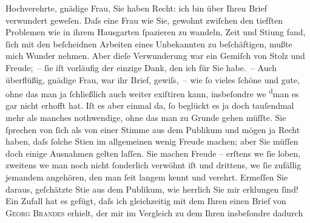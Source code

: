 \pstart{}Hochverehrte, gnädige Frau,\pend\vspace{0.5em}
\pstart
           Sie haben Recht: ich bin über Ihren Brief verwundert geweſen. Daſs eine Frau wie Sie,
               gewohnt zwiſchen den tiefſten Problemen wie in ihrem Hausgarten{ }ſpazieren zu wandeln,
               Zeit und Sti{\geminationm}ung fand,{ }ſich mit den beſcheidnen Arbeiten
               eines Unbekannten zu beſchäftigen, mußte mich Wunder nehmen. Aber dieſe Verwunderung
                  {\pb}war ein Gemiſch von Stolz und Freude; –{ }ſie iſt vorläufig der einzige
               Dank, den ich für Sie habe. – Auch überflüßig, gnädige Frau, war ihr Brief, gewiſs, –
               wie{ }ſo vieles{ }ſchöne und gute, ohne das man ja{ }ſchließlich auch weiter exiſtiren
               kann, insbeſondre we{\geminationn}{ }\substVorne{}\textsuperscript{d}\substDazwischen{}m\substHinten{}an es gar nicht erhofft hat. Iſt es aber einmal da,{ }ſo beglückt es ja doch
               tauſendmal mehr als manches noth{\pb}wendige, ohne das man zu Grunde gehen
               müſſte. Sie{ }ſprechen von{ }ſich als von einer Stimme aus dem Publikum und mögen ja
               Recht haben, daſs{ }ſolche Sti{\geminationm}en im allgemeinen wenig
               Freude machen; aber Sie müſſen doch einige Ausnahmen gelten laſſen. Sie machen Freude
               – erſtens we{\geminationn}{ }ſie loben, zweitens we{\geminationn}{ }{\pb}man noch nicht{ }ſonderlich verwöhnt iſt und drittens, we{\geminationn}{ }ſie zufällig jemandem angehören, den man{ }ſeit
               langem kennt und verehrt. Ermeſſen Sie daraus, geſchätzte Sti{\geminationm}e aus dem Publikum, wie herrlich Sie mir erklungen{ }ſind! Ein Zufall hat es gefügt, daſs ich gleichzeitig mit dem Ihren einen Brief von
                  \textsc{Georg Brandes} erhielt, der mir im {\pb}Vergleich zu dem Ihren insbeſondre dadurch
